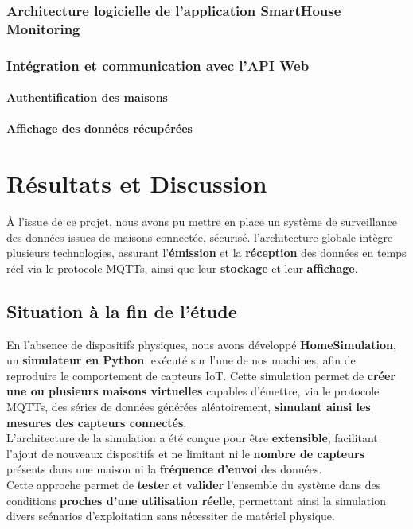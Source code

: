 \documentclass[10pt, a4paper]{report}
\begin{document}
	\subsection{Architecture logicielle de l'application SmartHouse Monitoring}
	\subsection{Intégration et communication avec l'API Web}
	\subsubsection{Authentification des maisons}
	\subsubsection{Affichage des données récupérées}
	
	\chapter{Résultats et Discussion}
	À l’issue de ce projet, nous avons pu mettre en place un système de surveillance des données issues de maisons connectée, sécurisé. l'architecture globale intègre plusieurs technologies, assurant l'\textbf{émission} et la \textbf{réception} des données en temps réel via le protocole MQTTs, ainsi que leur \textbf{stockage} et leur \textbf{affichage}.\\
	\section{Situation à la fin de l’étude}

	En l'absence de dispositifs physiques, nous avons développé \textbf{HomeSimulation}, un \textbf{simulateur en Python}, exécuté sur l’une de nos machines, afin de reproduire le comportement de capteurs IoT. Cette simulation permet de \textbf{créer une ou plusieurs maisons virtuelles} capables d’émettre, via le protocole MQTTs, des séries de données générées aléatoirement, \textbf{simulant ainsi les mesures des capteurs connectés}.\\
	L’architecture de la simulation a été conçue pour être \textbf{extensible}, facilitant l’ajout de nouveaux dispositifs et ne limitant ni le \textbf{nombre de capteurs} présents dans une maison ni la \textbf{fréquence d’envoi} des données.\\
	Cette approche permet de \textbf{tester} et \textbf{valider} l’ensemble du système dans des conditions \textbf{proches d’une utilisation réelle}, permettant ainsi la simulation divers scénarios d’exploitation sans nécessiter de matériel physique.\\
	
\end{document}
